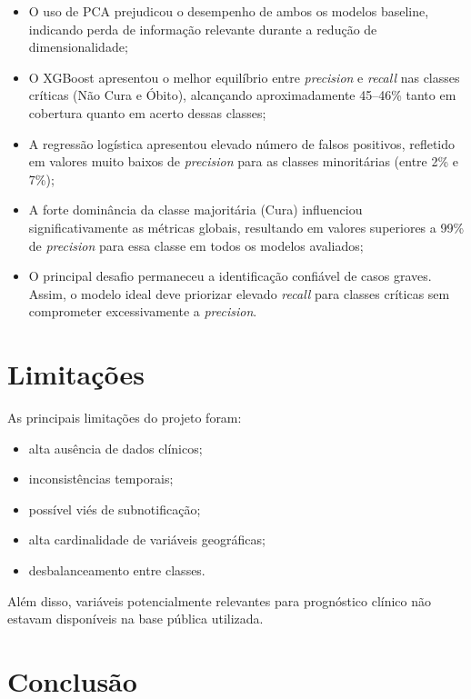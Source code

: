 \documentclass[11pt,a4paper]{article}
\begin{document}
\begin{itemize}
    \item O uso de PCA prejudicou o desempenho de ambos os modelos baseline, indicando perda de informação relevante durante a redução de dimensionalidade;

    \item O XGBoost apresentou o melhor equilíbrio entre \textit{precision} e \textit{recall} nas classes críticas (Não Cura e Óbito), alcançando aproximadamente 45--46\% tanto em cobertura quanto em acerto dessas classes;

    \item A regressão logística apresentou elevado número de falsos positivos, refletido em valores muito baixos de \textit{precision} para as classes minoritárias (entre 2\% e 7\%);

    \item A forte dominância da classe majoritária (Cura) influenciou significativamente as métricas globais, resultando em valores superiores a 99\% de \textit{precision} para essa classe em todos os modelos avaliados;

    \item O principal desafio permaneceu a identificação confiável de casos graves. Assim, o modelo ideal deve priorizar elevado \textit{recall} para classes críticas sem comprometer excessivamente a \textit{precision}.
\end{itemize}

\section{Limitações}

As principais limitações do projeto foram:

\begin{itemize}
    \item alta ausência de dados clínicos;
    \item inconsistências temporais;
    \item possível viés de subnotificação;
    \item alta cardinalidade de variáveis geográficas;
    \item desbalanceamento entre classes.
\end{itemize}

Além disso, variáveis potencialmente relevantes para prognóstico clínico não estavam disponíveis na base pública utilizada.

\section{Conclusão}
\end{document}
